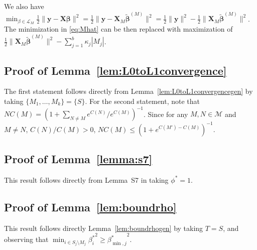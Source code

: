 \documentclass[aos]{imsart}
\theoremstyle{plain}
\newcommand{\bs}{\boldsymbol}
\begin{document}
\begin{supplement}
 We also have $\min_{\beta\in \mathcal{L}_M} \tfrac{1}{2}\|\bs y-\bs X\bs\beta\|^2=\tfrac{1}{2}\|\bs y-\bs X_{\!\!M}\tilde{\bs \beta}^{(M)}\|^2=\tfrac{1}{2}\|\bs y\|^2-\tfrac{1}{2}\|\bs X_{\!\!M}\tilde{\bs\beta}^{(M)}\|^2$. The minimization in \eqref{eq:Mhat} can be then replaced with maximization of $\tfrac{1}{2}
 \|\bs X_{\!\!M}\tilde{\bs\beta}^{(M)}\|^2-\sum_{j=1}^b \kappa_j|M_j|$.

\subsection{Proof of Lemma~\ref{lem:L0toL1convergence}}
The first statement follows directly from Lemma~\ref{lem:L0toL1convergencegen} by taking $\{M_1,\ldots,M_k\}=\{S\}$. For the second statement, note that  $NC(M)=(1+\sum_{N \neq M} e^{C(N)}/ e^{C(M)})^{-1}$. Since for any $M,N\in \mathcal{M}$ and $M\neq N$, $C(N) / C(M)>0$, $NC(M) \leq (1+e^{C(M')-C(M)})^{-1}$.

\subsection{Proof of Lemma~\ref{lemma:s7}}
    This result follows directly from Lemma~S7 in \cite{rossell2022concentration} taking $\phi^*=1$.

\subsection{Proof of Lemma~\ref{lem:boundrho}}
This result follows directly Lemma~\ref{lem:boundrhogen} by taking $T=S$, and observing that $\min_{i\in S_j\setminus M_j}{\beta^*_i}^2\geq {\beta^*_{\min,j}}^2$.


\end{supplement}
\end{document}
